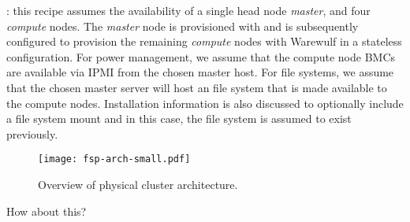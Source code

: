 : this recipe assumes the availability of a single head node
{\em master}, and four {\em compute} nodes. The {\em master} node is
provisioned with \baseOS{} and is subsequently configured to provision the
remaining {\em compute} nodes with Warewulf in a stateless configuration. For
power management, we assume that the compute node BMCs are available via IPMI
from the chosen master host. For file systems, we assume that the chosen master
server will host an \NFS{} file system that is made available to the compute
nodes. Installation information is also discussed to optionally include
a \Lustre{} file system mount and in this case, the \Lustre{} file system is
assumed to exist previously.

\begin{figure}[b!]
\center
\texttt{[image: fsp-arch-small.pdf]}
\vspace*{-0.2cm}
\caption{Overview of physical cluster architecture.}
\end{figure}


How about this?
